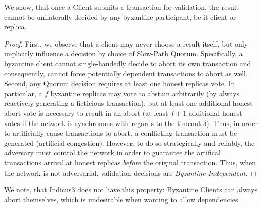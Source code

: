 We show, that once a Client submits a transaction for validation, the result cannot be unilaterally decided by any byzantine participant, be it client or replica.
\begin{proof}
First, we observe that a client may never choose a result itself, but only implicitly influence a decision by choice of Slow-Path Quorum. Specifically, a byzantine client cannot single-handedly decide to abort its own transaction and consequently, cannot force potentially dependent transactions to abort as well. 
Second, any Quorum decision requires at least one honest replicas vote. In particular, a $f$ byzantine replicas may vote to abstain arbitrarily (by always reactively generating a ficticious transaction), but at least one additional honest abort vote is necessary to result in an abort (at least $f+1$ additional honest votes if the network is synchronous with regards to the timeout $\delta$). 
Thus, in order to artificially cause transactions to abort, a conflicting transaction must be generated (artificial congestion). However, to do so strategically and reliably, the adversary must control the network in order to guarantee the artifical transactions arrival at honest replicas \textit{before} the original transaction. 
Thus, when the network is not adversarial, validation decisions are \textit{Byzantine Independent}.

\end{proof}
We note, that Indicus3 does not have this property: Byzantine Clients can always abort themselves, which is undesirable when wanting to allow dependencies. 



